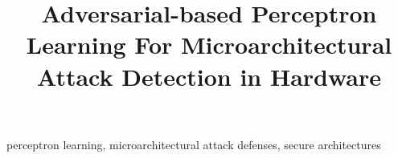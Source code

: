 \documentclass[conference]{IEEEtran}
\begin{document}
\title{Adversarial-based Perceptron Learning For Microarchitectural Attack Detection in Hardware \\

}

\setlength{\parskip}{1em}



\maketitle

\begin{IEEEkeywords}
perceptron learning, microarchitectural attack defenses, secure architectures
\end{IEEEkeywords}












\end{document}
